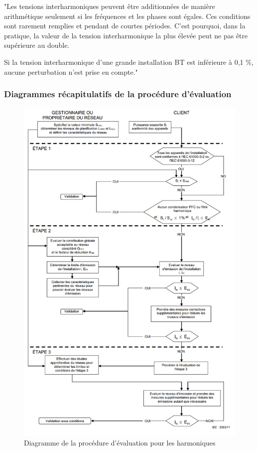 "Les tensions interharmoniques peuvent être additionnées de manière arithmétique seulement si les fréquences et les phases sont égales. Ces conditions sont rarement remplies et pendant de courtes périodes. C'est pourquoi, dans la pratique, la valeur de la tension interharmonique la plus élevée peut ne pas être supérieure au double.

Si la tension interharmonique d'une grande installation BT est inférieure à 0,1 \%, aucune perturbation n'est prise en compte."




\subsubsection{Diagrammes récapitulatifs de la procédure d'évaluation}

\begin{figure}[H]
    \begin{center}
        \includegraphics[width=\textwidth]{assets/figures/IECTR61000_sch.png}
    \end{center}
    \caption{Diagramme de la procédure d'évaluation pour les harmoniques}
    \label{IECTR61000_sch}
\end{figure}









